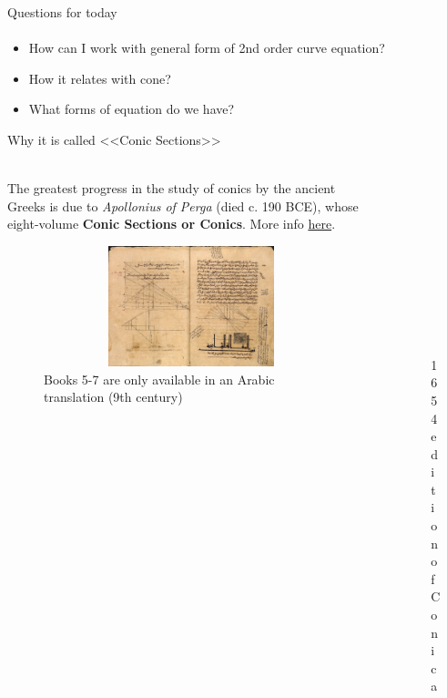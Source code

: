 \documentclass[aspectratio=169]{beamer}
\begin{document}
\begin{frame}[t]{Questions for today}
    \framesubtitle{}
    \begin{itemize}
        \item How can I work with general form of 2nd order curve equation?
        \item How it relates with cone?
        \item What forms of equation do we have?
    \end{itemize}
\end{frame}

\begin{frame}[t]{Why it is called <<Conic Sections>>}
\framesubtitle{}
    \begin{columns}[T,onlytextwidth]
        \begin{column}{0.69\textwidth}
            The greatest progress in the study of conics by the ancient Greeks is due to \textit{Apollonius of Perga} (died c. 190 BCE), whose eight-volume \textbf{Conic Sections or Conics}. More info \href{https://en.wikipedia.org/wiki/Conic_section}{here}.
            \begin{figure}[H]
                \centering\includegraphics[height=3.5cm,width=1\textwidth,keepaspectratio]{conica_book.png}
                \caption*{Books 5-7 are only available in an Arabic translation (9th century)}
                \label{fig:conica_book.png}
            \end{figure}
        \end{column}
        \begin{column}{0.29\textwidth}
            \vspace{-0.5cm}
            \begin{figure}[H]
                \centering\includegraphics[height=5cm,width=1\textwidth,keepaspectratio]{apollonius_book.jpg}
                \caption*{1654 edition of Conica}
                \label{fig:apollonius_book.jpg}
            \end{figure}
        \end{column}
    \end{columns}
\end{frame}
\end{document}
